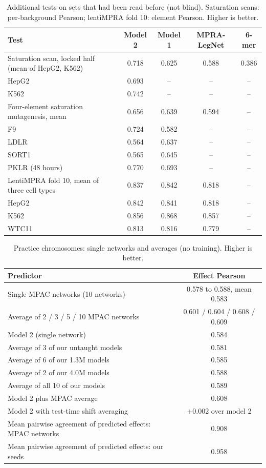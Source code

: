 \documentclass[11pt]{article}
\begin{document}
\begin{table}[h]
\centering
\caption{Additional tests on sets that had been read before (not blind). Saturation scans: per-background Pearson; lentiMPRA fold 10: element Pearson. Higher is better.}
\label{tab:extra}
\footnotesize
\begin{tabular}{lcccc}
\toprule
Test & Model 2 & Model 1 & MPRA-LegNet & 6-mer \\
\midrule
Saturation scan, locked half (mean of HepG2, K562) & 0.718 & 0.625 & 0.588 & 0.386 \\
\quad HepG2 & 0.693 & -- & -- & -- \\
\quad K562 & 0.742 & -- & -- & -- \\
Four-element saturation mutagenesis, mean & 0.656 & 0.639 & 0.594 & -- \\
\quad F9 & 0.724 & 0.582 & -- & -- \\
\quad LDLR & 0.564 & 0.637 & -- & -- \\
\quad SORT1 & 0.565 & 0.645 & -- & -- \\
\quad PKLR (48 hours) & 0.770 & 0.693 & -- & -- \\
LentiMPRA fold 10, mean of three cell types & 0.837 & 0.842 & 0.818 & -- \\
\quad HepG2 & 0.842 & 0.841 & 0.818 & -- \\
\quad K562 & 0.856 & 0.868 & 0.857 & -- \\
\quad WTC11 & 0.813 & 0.816 & 0.779 & -- \\
\bottomrule
\end{tabular}
\end{table}

\begin{table}[h]
\centering
\caption{Practice chromosomes: single networks and averages (no training). Higher is better.}
\label{tab:decomp}
\small
\begin{tabular}{lc}
\toprule
Predictor & Effect Pearson \\
\midrule
Single MPAC networks (10 networks) & 0.578 to 0.588, mean 0.583 \\
Average of 2 / 3 / 5 / 10 MPAC networks & 0.601 / 0.604 / 0.608 / 0.609 \\
Model 2 (single network) & 0.584 \\
Average of 3 of our untaught models & 0.581 \\
Average of 6 of our 1.3M models & 0.585 \\
Average of 2 of our 4.0M models & 0.588 \\
Average of all 10 of our models & 0.589 \\
Model 2 plus MPAC average & 0.608 \\
Model 2 with test-time shift averaging & +0.002 over model 2 \\
\midrule
Mean pairwise agreement of predicted effects: MPAC networks & 0.908 \\
Mean pairwise agreement of predicted effects: our seeds & 0.958 \\
\bottomrule
\end{tabular}
\end{table}
\end{document}
